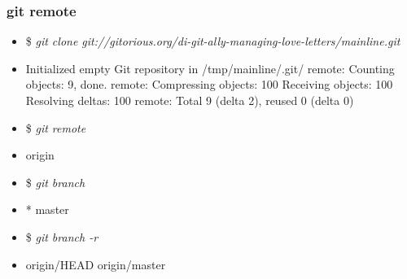 \documentclass[10pt]{beamer}
\newcommand{\command}[1]{\textsl{\textit{#1}}}
\begin{document}
%
%

\begin{frame}[fragile]
\frametitle{git remote}

\begin{block}{}
\scriptsize
\begin{semiverbatim}
\begin{itemize}[<+-| alert@+>]
\item[]{\$ \command{git clone git://gitorious.org/di-git-ally-managing-love-letters/mainline.git}}
\item[]{Initialized empty Git repository in /tmp/mainline/.git/
remote: Counting objects: 9, done.
remote: Compressing objects: 100%
Receiving objects: 100%
Resolving deltas: 100%
remote: Total 9 (delta 2), reused 0 (delta 0)}

\item[]{\$ \command{git remote}}
\item[]{origin}

\item[]{\$ \command{git branch}}
\item[]{* master}

\item[]{\$ \command{git branch -r}}
\item[]{  origin/HEAD
  origin/master}
\end{itemize}
\end{semiverbatim}
\end{block}

\end{frame}

%
%
\end{document}
